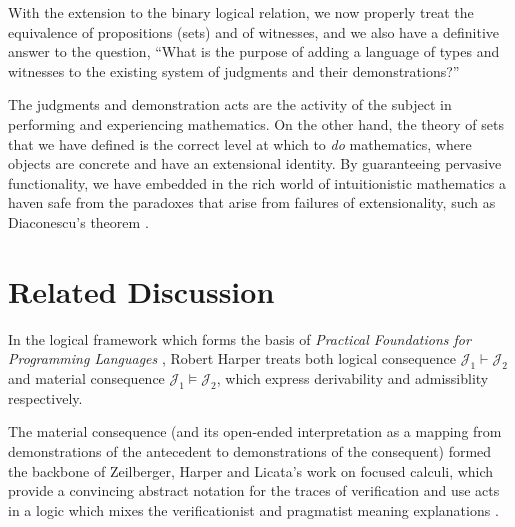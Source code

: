 \documentclass[11pt]{amsart}
\theoremstyle{definition}
\theoremstyle{remark}
\numberwithin{equation}{section}
\newcommand\JJ{\mathcal{J}}
\begin{document}
With the extension to the binary logical relation, we now properly treat the
equivalence of propositions (sets) and of witnesses, and we also have a
definitive answer to the question, ``What is the purpose of adding a language of
types and witnesses to the existing system of judgments and their
demonstrations?''

The judgments and demonstration acts are the activity of the subject in
performing and experiencing mathematics. On the other hand, the theory of sets
that we have defined is the correct level at which to \emph{do} mathematics,
where objects are concrete and have an extensional identity. By guaranteeing
pervasive functionality, we have embedded in the rich world of intuitionistic
mathematics a haven safe from the paradoxes that arise from failures of
extensionality, such as Diaconescu's theorem \cite{sterling:diaconescu}.

\section{Related Discussion}

In the logical framework which forms the basis of \emph{Practical Foundations
for Programming Languages} \cite{PFPL}, Robert Harper treats both logical
consequence $\JJ_1\vdash\JJ_2$ and material consequence $\JJ_1\vDash\JJ_2$,
which express derivability and admissiblity respectively.

The material consequence (and its open-ended interpretation as a mapping from
demonstrations of the antecedent to demonstrations of the consequent) formed the
backbone of Zeilberger, Harper and Licata's work on focused calculi, which
provide a convincing abstract notation for the traces of verification and use
acts in a logic which mixes the verificationist and pragmatist meaning
explanations \cite{zeilberger:thesis, licata-zeilberger-harper:focusing,
zeilberger:2008}.

\newpage


\end{document}
